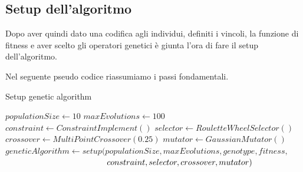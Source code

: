 \documentclass[a4paper, 11pt, oneside]{report}
\begin{document}
                \subsection{Setup dell'algoritmo}
                Dopo aver quindi dato una codifica agli individui, definiti i vincoli, la funzione di fitness e aver
                scelto gli operatori genetici è giunta l'ora di fare il setup dell'algoritmo.
                \par \noindent Nel seguente pseudo codice riassumiamo i passi fondamentali.
                \medskip
                \begin{algorithm}
                \caption{Setup genetic algorithm}
                    \label{setup:ga}
                    \begin{algorithmic}[1]
                        \State $populationSize \gets 10$
                        \State $maxEvolutions \gets 100$
                        \State
                        \State $constraint \gets ConstraintImplement()$
                        \State $selector \gets RouletteWheelSelector()$
                        \State $crossover \gets MultiPointCrossover(0.25)$
                        \State $mutator \gets GaussianMutator()$
                        \State
                        \State $geneticAlgorithm \gets setup(populationSize, maxEvolutions, genotype, fitness,$
                        \State $\hspace*{12.3em} constraint, selector, crossover, mutator)$
                    \end{algorithmic}
                \end{algorithm}

            \newpage
\end{document}
